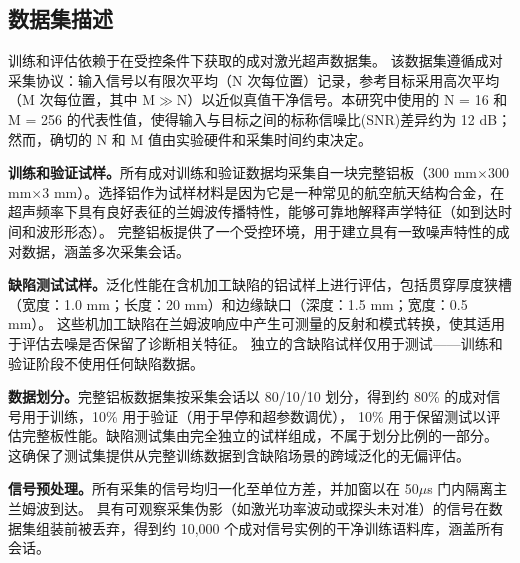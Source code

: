 \subsection{数据集描述}
\label{sec:dataset}

训练和评估依赖于在受控条件下获取的成对激光超声数据集。
该数据集遵循成对采集协议：输入信号以有限次平均（N 次每位置）记录，参考目标采用高次平均（M 次每位置，其中 M$\gg$N）以近似真值干净信号。本研究中使用的 N = 16 和 M = 256 的代表性值，使得输入与目标之间的标称信噪比(SNR)差异约为 12 dB；
然而，确切的 N 和 M 值由实验硬件和采集时间约束决定。

\textbf{训练和验证试样。}所有成对训练和验证数据均采集自一块完整铝板（300 mm$\times$300 mm$\times$3 mm）。选择铝作为试样材料是因为它是一种常见的航空航天结构合金，在超声频率下具有良好表征的兰姆波传播特性，能够可靠地解释声学特征（如到达时间和波形形态）。
完整铝板提供了一个受控环境，用于建立具有一致噪声特性的成对数据，涵盖多次采集会话。

\textbf{缺陷测试试样。}泛化性能在含机加工缺陷的铝试样上进行评估，包括贯穿厚度狭槽（宽度：1.0 mm；长度：20 mm）和边缘缺口（深度：1.5 mm；宽度：0.5 mm）。
这些机加工缺陷在兰姆波响应中产生可测量的反射和模式转换，使其适用于评估去噪是否保留了诊断相关特征。
独立的含缺陷试样仅用于测试——训练和验证阶段不使用任何缺陷数据。

\textbf{数据划分。}完整铝板数据集按采集会话以 80/10/10 划分，得到约 80\% 的成对信号用于训练，10\% 用于验证（用于早停和超参数调优），
10\% 用于保留测试以评估完整板性能。缺陷测试集由完全独立的试样组成，不属于划分比例的一部分。
这确保了测试集提供从完整训练数据到含缺陷场景的跨域泛化的无偏评估。

\textbf{信号预处理。}所有采集的信号均归一化至单位方差，并加窗以在 50$\mu$s 门内隔离主兰姆波到达。
具有可观察采集伪影（如激光功率波动或探头未对准）的信号在数据集组装前被丢弃，得到约 10,000 个成对信号实例的干净训练语料库，涵盖所有会话。